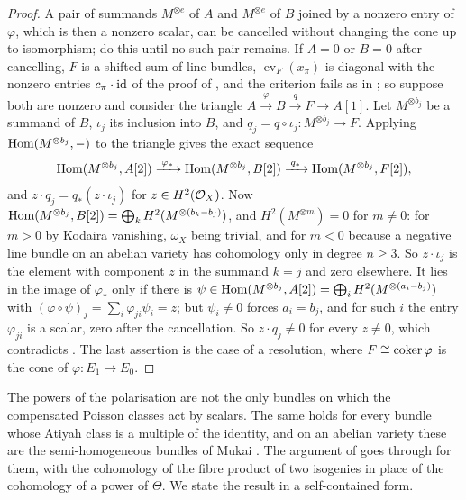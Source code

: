 \begin{proof}
A pair of summands $M^{\otimes e}$ of $A$ and $M^{\otimes e}$ of $B$ joined
by a nonzero entry of $\varphi$, which is then a nonzero scalar, can be
cancelled without changing the cone up to isomorphism; do this until no such
pair remains. If $A=0$ or $B=0$ after cancelling, $F$ is a shifted sum of
line bundles, $\operatorname{ev}_{F}(x_{\pi})$ is diagonal with the nonzero
entries $c_{\pi}\cdot\operatorname{id}$ of the proof of , and the
criterion fails as in ; so suppose both are nonzero and
consider the triangle $A\xrightarrow{\varphi}B\xrightarrow{\;q\;}F\to A[1]$.
Let $M^{\otimes b_{j}}$ be a summand of $B$, $\iota_{j}$ its inclusion into
$B$, and $q_{j}=q\circ\iota_{j}\colon M^{\otimes b_{j}}\to F$. Applying
$\operatorname{Hom}(M^{\otimes b_{j}},-)$ to the triangle gives the exact sequence
\[
  \operatorname{Hom}(M^{\otimes b_{j}},A[2])\xrightarrow{\;\varphi_{*}\;}
  \operatorname{Hom}(M^{\otimes b_{j}},B[2])\xrightarrow{\;q_{*}\;}
  \operatorname{Hom}(M^{\otimes b_{j}},F[2]),
\]
and $z\cdot q_{j}=q_{*}(z\cdot\iota_{j})$ for $z\in H^{2}(\mathcal{O}_{X})$. Now
$\operatorname{Hom}(M^{\otimes b_{j}},B[2])=\bigoplus_{k}H^{2}(M^{\otimes(b_{k}-b_{j})})$,
and $H^{2}(M^{\otimes m})=0$ for $m\ne0$: for $m>0$ by Kodaira vanishing,
$\omega_{X}$ being trivial, and for $m<0$ because a negative line bundle on
an abelian variety has cohomology only in degree $n\ge3$. So $z\cdot\iota_{j}$
is the element with component $z$ in the summand $k=j$ and zero elsewhere. It
lies in the image of $\varphi_{*}$ only if there is
$\psi\in\operatorname{Hom}(M^{\otimes b_{j}},A[2])=\bigoplus_{i}H^{2}(M^{\otimes(a_{i}-b_{j})})$
with $(\varphi\circ\psi)_{j}=\sum_{i}\varphi_{ji}\psi_{i}=z$; but $\psi_{i}\ne0$
forces $a_{i}=b_{j}$, and for such $i$ the entry $\varphi_{ji}$ is a scalar,
zero after the cancellation. So $z\cdot q_{j}\ne0$ for every $z\ne0$, which
contradicts . The last assertion is the case of a
resolution, where $F\cong\operatorname{coker}\varphi$ is the cone of $\varphi\colon E_{1}\to E_{0}$.
\end{proof}

The powers of the polarisation are not the only bundles on which the
compensated Poisson classes act by scalars. The same holds for every bundle
whose Atiyah class is a multiple of the identity, and on an abelian variety
these are the semi-homogeneous bundles of Mukai \cite{Muk78}. The argument of
 goes through for them, with the cohomology of the fibre
product of two isogenies in place of the cohomology of a power of $\Theta$.
We state the result in a self-contained form.

